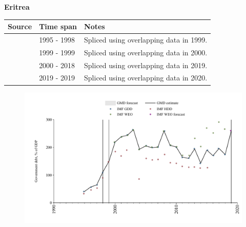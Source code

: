 \documentclass[12pt,a4paper,landscape]{article}
\begin{document}
\begin{adjustbox}{max totalsize={\paperwidth}{\paperheight},center}
\begin{minipage}[t][\textheight][t]{\textwidth}
\vspace*{0.5cm}
{}
\begin{center}
{\Large\bfseries Eritrea}
\end{center}
\vspace{0.5cm}
\begin{table}[H]
\centering
\small
\begin{tabular}{|l|l|l|}
\hline
\textbf{Source} & \textbf{Time span} & \textbf{Notes} \\
\hline
\rowcolor{white}\cite{IMF_GDD}& 1995 - 1998 &Spliced using overlapping data in 1999.\\
\rowcolor{lightgray}\cite{IMF_HDD}& 1999 - 1999 &Spliced using overlapping data in 2000.\\
\rowcolor{white}\cite{IMF_GDD}& 2000 - 2018 &Spliced using overlapping data in 2019.\\
\rowcolor{lightgray}\cite{IMF_WEO_forecast}& 2019 - 2019 &Spliced using overlapping data in 2020.\\
\hline
\end{tabular}
\end{table}
\begin{figure}[H]
\centering
\includegraphics[width=\textwidth,height=0.6\textheight,keepaspectratio]{graphs/ERI_govdebt_GDP.pdf}
\end{figure}
\end{minipage}
\end{adjustbox}
\end{document}
